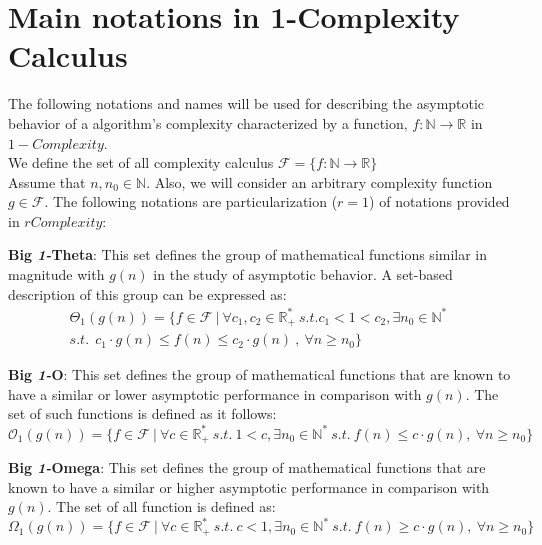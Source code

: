 \section{Main notations in 1-Complexity Calculus}
The following notations and names will be used for describing the asymptotic behavior of a algorithm's complexity characterized by a function, $f:\mathbb{N}\longrightarrow\mathbb{R}$ in $1-Complexity$. \\
We define the set of all complexity calculus $\mathcal{F}= \lbrace f:\mathbb{N}\longrightarrow\mathbb{R} \rbrace$
\\Assume that $n, n_{0}\in\mathbb{N}$. Also, we will consider an arbitrary complexity function $g \in \mathcal{F}$. 
The following notations are particularization ($r = 1$) of notations provided in $rComplexity$:
\begin{definition}
\textbf{Big \textit{1-}Theta}: This set defines the group of mathematical functions similar in magnitude with  $g(n)$ in the study of asymptotic behavior. A set-based description of this group can be expressed as:
  \[\begin{split} \Theta_{1}(g(n)) = \lbrace f \in \mathcal{F}\ |\ \forall c_{1}, c_{2} \in \mathbb{R}^{*}_{+} \ s.t.  c_{1} < 1 < c_{2} , \exists n_{0} \in \mathbb{N}^{*}\ \\ s.t.\ \ c_{1} \cdot g(n) \leq f(n) \leq c_{2} \cdot g(n)\ ,\  \forall n \geq n_{0} \rbrace \end{split} \]
\end{definition} 
\begin{definition} 
\textbf{Big \textit{1-}O}: This set defines the group of mathematical functions that are known to have a similar or lower
 asymptotic performance in comparison with  $g(n)$. The set of such functions is defined as it follows:
  \[\mathcal{O}_{1}(g(n)) = \lbrace f \in \mathcal{F}\ |\ \forall c  \in \mathbb{R}^{*}_{+} \ s.t.\  1 < c, \exists n_{0} \in \mathbb{N}^{*}\ s.t.\  f(n) \leq c \cdot g(n),\  \forall n \geq n_{0} \rbrace\]
\end{definition}
\begin{definition}

\textbf{Big \textit{1-}Omega}: This set defines the group of mathematical functions that are known to have a similar or higher asymptotic performance in comparison with  $g(n)$. The set of all function is defined as:
    \[\Omega_{1}(g(n)) = \lbrace f \in \mathcal{F}\ |\ \forall c  \in \mathbb{R}^{*}_{+}\ s.t. \ c < 1, \exists n_{0} \in \mathbb{N}^{*}\ s.t.\  f(n) \geq c \cdot g(n),\  \forall n \geq n_{0} \rbrace\]
\end{definition}
